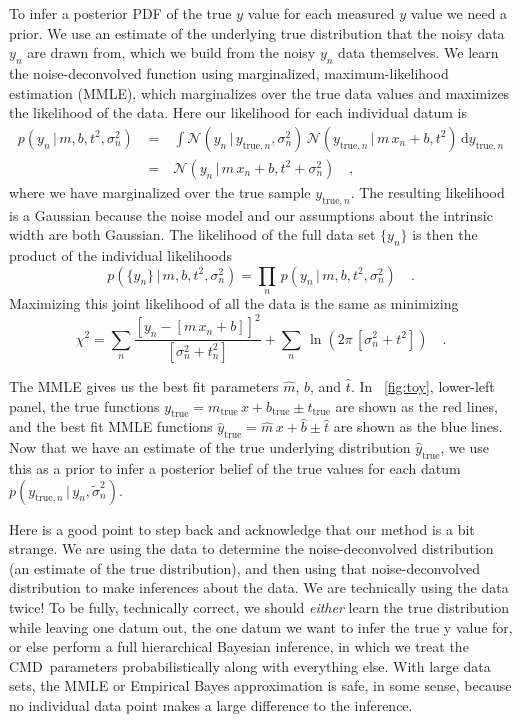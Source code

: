 \documentclass[modern]{aastex61}
\newcommand{\acronym}[1]{{\small{#1}}}
\newcommand{\cmd}{\acronym{CMD}}
\newcommand{\given}{\,|\,}
\newcommand{\dd}{\mathrm{d}}
\newcommand{\true}{\mathrm{true}}
\begin{document}
To infer a posterior PDF of the true $y$ value for each measured $y$ value we need a prior. We use an estimate of the underlying true distribution that the noisy data $y_n$ are drawn from, which we build from the noisy $y_n$ data themselves.
We learn the noise-deconvolved function using marginalized, maximum-likelihood estimation (MMLE), which marginalizes over the true data values and maximizes the likelihood of the data. Here our likelihood for each individual datum is
\begin{eqnarray}
p(y_n \given m, b, t^2, \sigma_n^2) \ &=& \ \int \mathcal{N}(y_n \given y_{\true,n}, \sigma_n^2) \, \mathcal{N}(y_{\true,n} \given m\,x_n + b, t^2 ) \, \dd y_{\true, n} \\
&=&  \ \mathcal{N}(y_n \given m\,x_n + b, t^2 + \sigma_n^2) \quad,
\label{eq:toyLike}
\end{eqnarray}
where we have marginalized over the true sample $y_{\true, n}$. The resulting likelihood is a Gaussian because the noise model and our assumptions about the intrinsic width are both Gaussian. The likelihood of the full data set $\{y_n\}$ is then the product of the individual likelihoods
\begin{equation}
p(\{y_n\} \given m, b, t^2, \sigma_n^2) = \prod_n\, p(y_n \given m, b, t^2, \sigma_n^2) \quad .
\label{eq:toyLikeFull}
\end{equation}
Maximizing this joint likelihood of all the data is the same as minimizing
\begin{equation}
\chi^2 = \sum_n \frac{[y_n - [m\,x_n + b]]^2}{[\sigma_n^2 + t_n^2]} + \sum_n\,\ln(2\pi\,[\sigma_n^2 + t^2])
\quad .
\label{eq:chisq}
\end{equation}

The MMLE gives us the best fit parameters $\hat{m}$, $\hat{b}$, and $\hat{t}$. In \figurename~\ref{fig:toy}, lower-left panel, the true functions $y_{\true} = m_{\true}\,x + b_{\true} \pm t_{\true}$ are shown as the red lines, and the best fit MMLE functions $\hat{y}_{\true} = \hat{m}\, x + \hat{b} \pm \hat{t}$ are shown as the blue lines. Now that we have an estimate of the true underlying distribution $\hat{y}_{\true}$, we use this as a prior to infer a posterior belief of the true values for each datum $p(y_{\true,n} \given y_n, \tilde{\sigma}_n^2)$.

Here is a good point to step back and acknowledge that our method is a
bit strange. We are using the data to determine the
noise-deconvolved distribution (an estimate of the true
distribution), and then using that noise-deconvolved distribution to
make inferences about the data. We are technically using the data
twice! To be fully, technically correct, we should \emph{either} learn the true
distribution while leaving one datum out, the one datum we want to
infer the true y value for, or else perform a full hierarchical Bayesian inference,
in which we treat the \cmd\ parameters probabilistically along with everything else.
With large data sets, the MMLE or Empirical Bayes approximation is safe,
in some sense, because no individual data point makes a large difference to
the inference.
\end{document}
